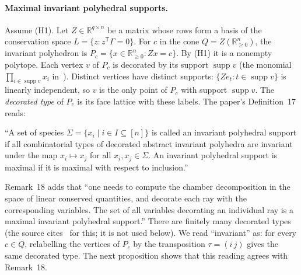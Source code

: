 \documentclass[11pt,a4paper]{report}
\providecommand{\R}{\mathbb{R}}
\newcommand{\supp}{\operatorname{supp}}
\begin{document}
\paragraph{Maximal invariant polyhedral supports.} Assume (H1). Let \(Z\in\R^{q\times n}\) be a matrix whose rows
form a basis of the conservation space \(L=\{z:z^{\mathsf T}\Gamma=0\}\). For \(c\) in the cone \(Q=Z(\R^n_{\ge0})\),
the invariant polyhedron is \(P_c=\{x\in\R^n_{\ge0}:Zx=c\}\). By (H1) it is a nonempty polytope. Each vertex \(v\) of
\(P_c\) is decorated by its support \(\supp v\) (the monomial \(\prod_{i\in\supp v}x_i\) in~\autocite{Iosif2026}).
Distinct vertices have distinct supports: \(\{Ze_t:t\in\supp v\}\) is linearly independent, so \(v\) is the only
point of \(P_c\) with support \(\supp v\). The
\emph{decorated type} of \(P_c\) is its face lattice with these labels. The paper's Definition~17 reads:

\begin{openquote}
``A set of species \(\Sigma=\{x_i\mid i\in I\subseteq[n]\}\) is called an invariant polyhedral support if all
combinatorial types of decorated abstract invariant polyhedra are invariant under the map \(x_i\mapsto x_j\) for all
\(x_i,x_j\in\Sigma\). An invariant polyhedral support is maximal if it is maximal with respect to inclusion.''
\end{openquote}

Remark~18 adds that ``one needs to compute the chamber decomposition in the space of linear conserved quantities, and
decorate each ray with the corresponding variables. The set of all variables decorating an individual ray is a
maximal invariant polyhedral support.'' There are finitely many decorated types (the source cites~\autocite{DeLoeraKimOnnSantos2009}
for this; it is not used below). We read ``invariant'' as: for every \(c\in Q\), relabelling the vertices of
\(P_c\) by the transposition \(\tau=(i\,j)\) gives the same decorated type. The next proposition shows that this
reading agrees with Remark~18.
\end{document}
